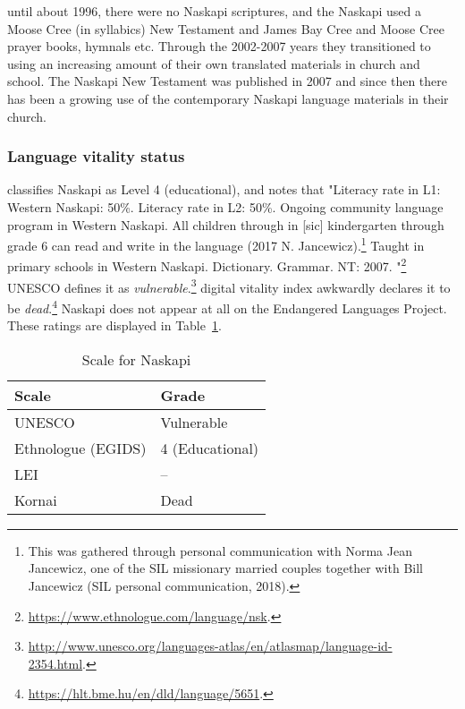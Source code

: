 until about 1996, there were no Naskapi scriptures, and the Naskapi used a Moose Cree (in syllabics) New Testament and James Bay Cree and Moose Cree prayer books, hymnals etc. Through the 2002-2007 years they transitioned to using an increasing amount of their own translated materials in church and school. The Naskapi New Testament was published in 2007 and since then there has been a growing use of the contemporary Naskapi language materials in their church.

\subsubsection{Language vitality status}
\label{sec:naskapi-vitality-status}

\citet{lewis2009ethnologue} classifies Naskapi as Level 4 (educational), and notes that "Literacy rate in L1: Western Naskapi: 50\%. Literacy rate in L2: 50\%. Ongoing community language program in Western Naskapi. All children through in [sic] kindergarten through grade 6 can read and write in the language (2017 N. Jancewicz).\footnote{This was gathered through personal communication with Norma Jean Jancewicz, one of the SIL missionary married couples together with Bill Jancewicz (SIL personal communication, 2018).} Taught in primary schools in Western Naskapi. Dictionary. Grammar. NT: 2007. "\footnote{\href{https://www.ethnologue.com/language/nsk}{https://www.ethnologue.com/language/nsk}. } UNESCO defines it as {\it vulnerable}.\footnote{\href{http://www.unesco.org/languages-atlas/en/atlasmap/language-id-2354.html}{http://www.unesco.org/languages-atlas/en/atlasmap/language-id-2354.html}. }  digital vitality index awkwardly declares it to be {\it dead}.\footnote{\href{https://hlt.bme.hu/en/dld/language/5651}{https://hlt.bme.hu/en/dld/language/5651}. } Naskapi does not appear at all on the Endangered Languages Project. These ratings are displayed in Table~\ref{table:naskapi}.

\begin{table}
\centering
\begin{tabular}{|p{5cm}|p{5cm}|} \hline
{\bf Scale} & {\bf Grade} \\ \hline
UNESCO & Vulnerable \\ \hline
Ethnologue (EGIDS) & 4 (Educational) \\ \hline
LEI & -- \\ \hline
Kornai & Dead \\ \hline
\end{tabular}
\caption{Scale for Naskapi}
\label{table:naskapi}
\end{table}

